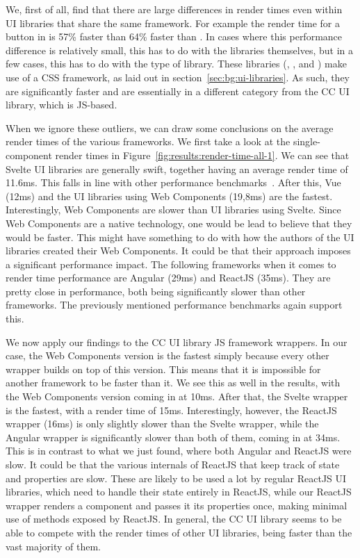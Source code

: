We, first of all, find that there are large differences in render times even within UI libraries that share the same framework. For example the render time for a button in  is 57\% faster than  64\% faster than . In cases where this performance difference is relatively small, this has to do with the libraries themselves, but in a few cases, this has to do with the type of library. These libraries (, , and ) make use of a CSS framework, as laid out in section~\ref{sec:bg:ui-libraries}. As such, they are significantly faster and are essentially in a different category from the CC UI library, which is JS-based.

When we ignore these outliers, we can draw some conclusions on the average render times of the various frameworks. We first take a look at the single-component render times in Figure~\ref{fig:results:render-time-all-1}. We can see that Svelte UI libraries are generally swift, together having an average render time of 11.6ms. This falls in line with other performance benchmarks~. After this, Vue (12ms) and the UI libraries using Web Components (19,8ms) are the fastest. Interestingly, Web Components are slower than UI libraries using Svelte. Since Web Components are a native technology, one would be lead to believe that they would be faster. This might have something to do with how the authors of the UI libraries created their Web Components. It could be that their approach imposes a significant performance impact. The following frameworks when it comes to render time performance are Angular (29ms) and ReactJS (35ms). They are pretty close in performance, both being significantly slower than other frameworks. The previously mentioned performance benchmarks again support this.

We now apply our findings to the CC UI library JS framework wrappers. In our case, the Web Components version is the fastest simply because every other wrapper builds on top of this version. This means that it is impossible for another framework to be faster than it. We see this as well in the results, with the Web Components version coming in at 10ms. After that, the Svelte wrapper is the fastest, with a render time of 15ms. Interestingly, however, the ReactJS wrapper (16ms) is only slightly slower than the Svelte wrapper, while the Angular wrapper is significantly slower than both of them, coming in at 34ms. This is in contrast to what we just found, where both Angular and ReactJS were slow. It could be that the various internals of ReactJS that keep track of state and properties are slow. These are likely to be used a lot by regular ReactJS UI libraries, which need to handle their state entirely in ReactJS, while our ReactJS wrapper renders a component and passes it its properties once, making minimal use of methods exposed by ReactJS. In general, the CC UI library seems to be able to compete with the render times of other UI libraries, being faster than the vast majority of them.


